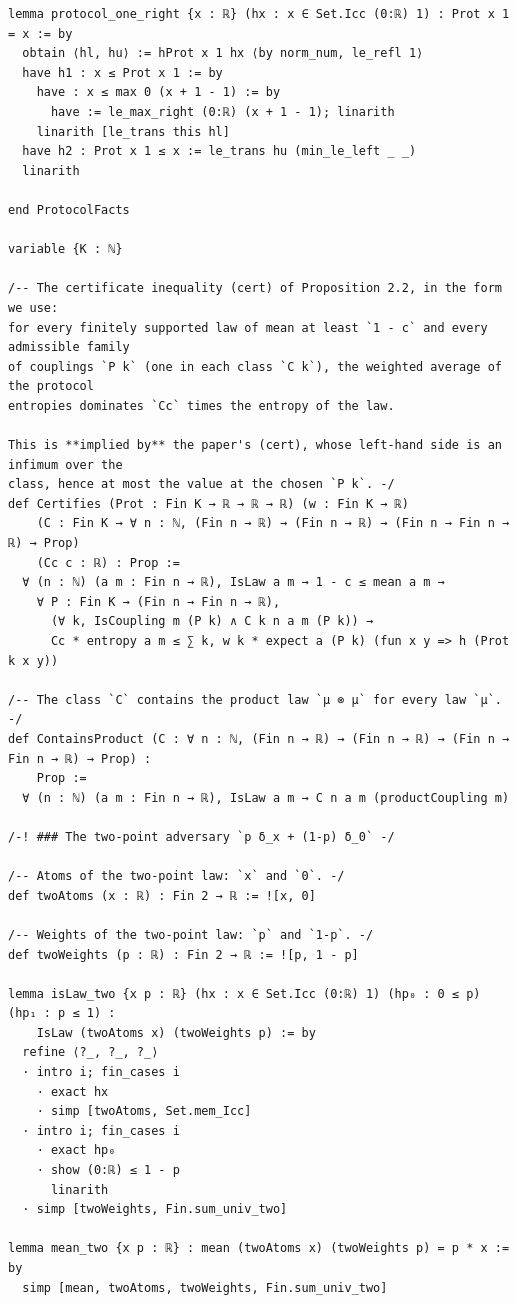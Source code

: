 \documentclass[11pt,a4paper]{article}
\theoremstyle{definition}
\theoremstyle{remark}
\begin{document}
\begin{Verbatim}[fontsize=\scriptsize,formatcom=\leanmono,samepage=false]
lemma protocol_one_right {x : ℝ} (hx : x ∈ Set.Icc (0:ℝ) 1) : Prot x 1 = x := by
  obtain ⟨hl, hu⟩ := hProt x 1 hx ⟨by norm_num, le_refl 1⟩
  have h1 : x ≤ Prot x 1 := by
    have : x ≤ max 0 (x + 1 - 1) := by
      have := le_max_right (0:ℝ) (x + 1 - 1); linarith
    linarith [le_trans this hl]
  have h2 : Prot x 1 ≤ x := le_trans hu (min_le_left _ _)
  linarith

end ProtocolFacts

variable {K : ℕ}

/-- The certificate inequality (cert) of Proposition 2.2, in the form we use:
for every finitely supported law of mean at least `1 - c` and every admissible family
of couplings `P k` (one in each class `C k`), the weighted average of the protocol
entropies dominates `Cc` times the entropy of the law.

This is **implied by** the paper's (cert), whose left-hand side is an infimum over the
class, hence at most the value at the chosen `P k`. -/
def Certifies (Prot : Fin K → ℝ → ℝ → ℝ) (w : Fin K → ℝ)
    (C : Fin K → ∀ n : ℕ, (Fin n → ℝ) → (Fin n → ℝ) → (Fin n → Fin n → ℝ) → Prop)
    (Cc c : ℝ) : Prop :=
  ∀ (n : ℕ) (a m : Fin n → ℝ), IsLaw a m → 1 - c ≤ mean a m →
    ∀ P : Fin K → (Fin n → Fin n → ℝ),
      (∀ k, IsCoupling m (P k) ∧ C k n a m (P k)) →
      Cc * entropy a m ≤ ∑ k, w k * expect a (P k) (fun x y => h (Prot k x y))

/-- The class `C` contains the product law `μ ⊗ μ` for every law `μ`. -/
def ContainsProduct (C : ∀ n : ℕ, (Fin n → ℝ) → (Fin n → ℝ) → (Fin n → Fin n → ℝ) → Prop) :
    Prop :=
  ∀ (n : ℕ) (a m : Fin n → ℝ), IsLaw a m → C n a m (productCoupling m)

/-! ### The two-point adversary `p δ_x + (1-p) δ_0` -/

/-- Atoms of the two-point law: `x` and `0`. -/
def twoAtoms (x : ℝ) : Fin 2 → ℝ := ![x, 0]

/-- Weights of the two-point law: `p` and `1-p`. -/
def twoWeights (p : ℝ) : Fin 2 → ℝ := ![p, 1 - p]

lemma isLaw_two {x p : ℝ} (hx : x ∈ Set.Icc (0:ℝ) 1) (hp₀ : 0 ≤ p) (hp₁ : p ≤ 1) :
    IsLaw (twoAtoms x) (twoWeights p) := by
  refine ⟨?_, ?_, ?_⟩
  · intro i; fin_cases i
    · exact hx
    · simp [twoAtoms, Set.mem_Icc]
  · intro i; fin_cases i
    · exact hp₀
    · show (0:ℝ) ≤ 1 - p
      linarith
  · simp [twoWeights, Fin.sum_univ_two]

lemma mean_two {x p : ℝ} : mean (twoAtoms x) (twoWeights p) = p * x := by
  simp [mean, twoAtoms, twoWeights, Fin.sum_univ_two]


\end{Verbatim}
\end{document}
